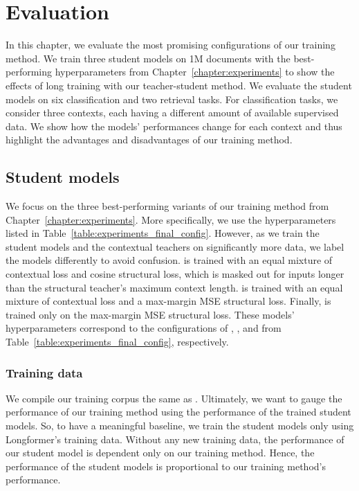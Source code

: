 \chapter{Evaluation}\label{chapter:evaluation}

In this chapter, we evaluate the most promising configurations of our training
method. We train three student models on 1M documents with the best-performing
hyperparameters from Chapter~\ref{chapter:experiments} to show the effects of
long training with our teacher-student method. We evaluate the student models
on six classification and two retrieval tasks. For classification tasks, we consider
three contexts, each having a different amount of available supervised data. We
show how the models' performances change for each context and thus
highlight the advantages and disadvantages of our training method.

\section{Student models}

We focus on the three best-performing variants of our training method from
Chapter~\ref{chapter:experiments}. More specifically, we use the hyperparameters
listed in Table~\ref{table:experiments_final_config}. However, as we train the
student models and the contextual teachers on significantly more data, we label
the models differently to avoid confusion. {\CosineStudent} is trained with an
equal mixture of contextual loss and cosine structural loss, which is masked
out for inputs longer than the structural teacher's maximum context length.
{\MSEStudent} is trained with an equal mixture of contextual loss and a
max-margin MSE structural loss. Finally, {\OnlyMSEStudent} is trained only on
the max-margin MSE structural loss. These models' hyperparameters correspond to
the configurations of ,
, and  from
Table~\ref{table:experiments_final_config}, respectively.

\subsection{Training data}

We compile our training corpus the same as . Ultimately, we want to gauge the performance of our training method using the
performance of the trained student models. So, to have a meaningful
baseline, we train the student models only using Longformer's training data.
Without any new training data, the performance of our student model is
dependent only on our training method. Hence, the performance of the student models is proportional to our training method's performance.


